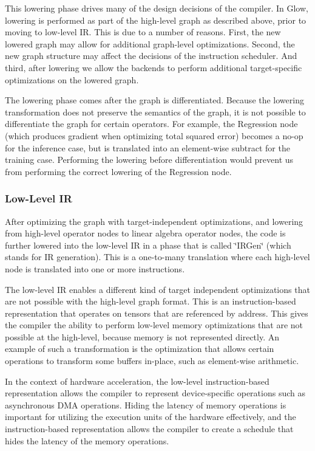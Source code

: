 This lowering phase drives many of the design decisions of the compiler. In Glow, lowering is performed as part of the high-\/level graph as described above, prior to moving to low-\/level IR. This is due to a number of reasons. First, the new lowered graph may allow for additional graph-\/level optimizations. Second, the new graph structure may affect the decisions of the instruction scheduler. And third, after lowering we allow the backends to perform additional target-\/specific optimizations on the lowered graph.

The lowering phase comes after the graph is differentiated. Because the lowering transformation does not preserve the semantics of the graph, it is not possible to differentiate the graph for certain operators. For example, the Regression node (which produces gradient when optimizing total squared error) becomes a no-\/op for the inference case, but is translated into an element-\/wise subtract for the training case. Performing the lowering before differentiation would prevent us from performing the correct lowering of the Regression node.

\subsubsection*{Low-\/\+Level IR}

After optimizing the graph with target-\/independent optimizations, and lowering from high-\/level operator nodes to linear algebra operator nodes, the code is further lowered into the low-\/level IR in a phase that is called \char`\"{}\+I\+R\+Gen\char`\"{} (which stands for IR generation). This is a one-\/to-\/many translation where each high-\/level node is translated into one or more instructions.

The low-\/level IR enables a different kind of target independent optimizations that are not possible with the high-\/level graph format. This is an instruction-\/based representation that operates on tensors that are referenced by address. This gives the compiler the ability to perform low-\/level memory optimizations that are not possible at the high-\/level, because memory is not represented directly. An example of such a transformation is the optimization that allows certain operations to transform some buffers in-\/place, such as element-\/wise arithmetic.

In the context of hardware acceleration, the low-\/level instruction-\/based representation allows the compiler to represent device-\/specific operations such as asynchronous D\+MA operations. Hiding the latency of memory operations is important for utilizing the execution units of the hardware effectively, and the instruction-\/based representation allows the compiler to create a schedule that hides the latency of the memory operations.

